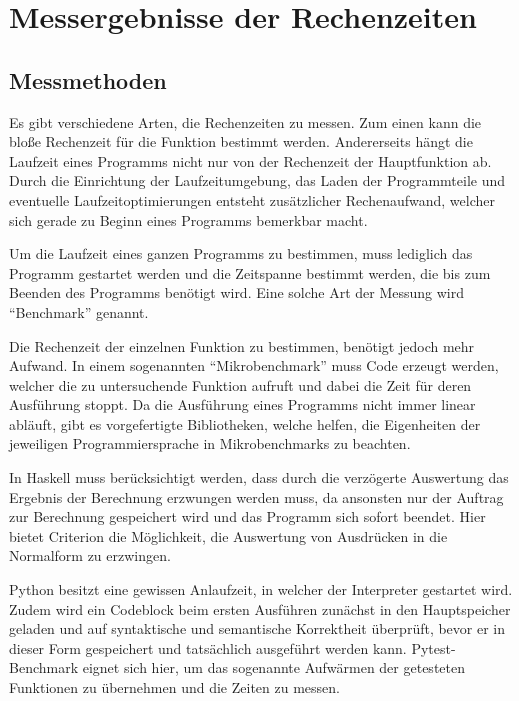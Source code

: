 \documentclass[11pt, parskip=half]{scrartcl}       %
\begin{document}

\section{Messergebnisse der Rechenzeiten}

\subsection{Messmethoden}

Es gibt verschiedene Arten, die Rechenzeiten zu messen.
Zum einen kann die bloße Rechenzeit für die Funktion bestimmt werden.
Andererseits hängt die Laufzeit eines Programms nicht nur von der Rechenzeit der Hauptfunktion ab.
Durch die Einrichtung der Laufzeitumgebung, das Laden der Programmteile und eventuelle Laufzeitoptimierungen entsteht zusätzlicher Rechenaufwand, welcher sich gerade zu Beginn eines Programms bemerkbar macht.

Um die Laufzeit eines ganzen Programms zu bestimmen, muss lediglich das Programm gestartet werden und die Zeitspanne bestimmt werden, die bis zum Beenden des Programms benötigt wird.
Eine solche Art der Messung wird ``Benchmark'' genannt.

Die Rechenzeit der einzelnen Funktion zu bestimmen, benötigt jedoch mehr Aufwand.
In einem sogenannten ``Mikrobenchmark'' muss Code erzeugt werden, welcher die zu untersuchende Funktion aufruft und dabei die Zeit für deren Ausführung stoppt.
Da die Ausführung eines Programms nicht immer linear abläuft, gibt es vorgefertigte Bibliotheken, welche helfen, die Eigenheiten der jeweiligen Programmiersprache in Mikrobenchmarks zu beachten. 

In Haskell muss berücksichtigt werden, dass durch die verzögerte Auswertung das Ergebnis der Berechnung erzwungen werden muss, da ansonsten nur der Auftrag zur Berechnung gespeichert wird und das Programm sich sofort beendet.
Hier bietet Criterion die Möglichkeit, die Auswertung von Ausdrücken in die Normalform zu erzwingen.

Python besitzt eine gewissen Anlaufzeit, in welcher der Interpreter gestartet wird.
Zudem wird ein Codeblock beim ersten Ausführen zunächst in den Hauptspeicher geladen und auf syntaktische und semantische Korrektheit überprüft, bevor er in dieser Form gespeichert und tatsächlich ausgeführt werden kann.
Pytest-Benchmark eignet sich hier, um das sogenannte Aufwärmen der getesteten Funktionen zu übernehmen und die Zeiten zu messen.
\end{document}
